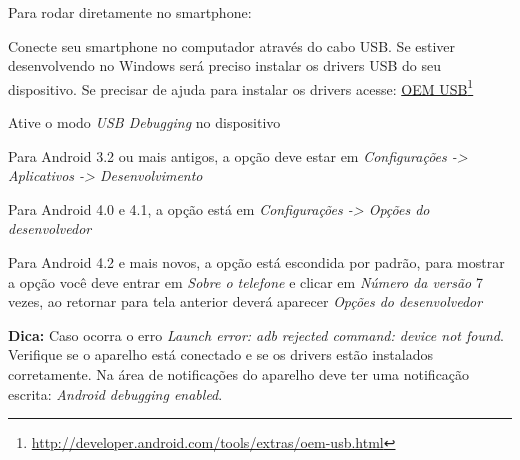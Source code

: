 \documentclass[a4paper,12pt,brazil,oneside]{book}
\begin{document}
\begin{singlespace}
Para rodar diretamente no smartphone:
\be
\item Conecte seu smartphone no computador através do cabo USB. Se estiver desenvolvendo no Windows será preciso instalar os drivers USB do seu dispositivo. Se precisar de ajuda para instalar os drivers acesse: \href{http://developer.android.com/tools/extras/oem-usb.html}{OEM USB}\footnote{\href{http://developer.android.com/tools/extras/oem-usb.html}{http://developer.android.com/tools/extras/oem-usb.html}}
\item Ative o modo \emph{USB Debugging} no dispositivo
	\bi
	\item Para Android 3.2 ou mais antigos, a opção deve estar em \textit{Configurações -> Aplicativos	 -> Desenvolvimento}
	\item Para Android 4.0 e 4.1, a opção está em \textit{Configurações -> Opções do desenvolvedor}
	\item Para Android 4.2 e mais novos, a opção está escondida por padrão, para mostrar a opção você deve entrar em \textit{Sobre o telefone} e clicar em \textit{Número da versão} 7 vezes, ao retornar para tela anterior deverá aparecer \textit{Opções do desenvolvedor}
	\ei
\ee

\begin{framed}
\textbf{Dica:} Caso ocorra o erro \emph{Launch error: adb rejected command: device not found}. Verifique se o aparelho está conectado e se os drivers estão instalados corretamente. Na área de notificações do aparelho deve ter uma notificação escrita: \emph{Android debugging enabled}. 
\end{framed}


\end{singlespace}
\end{document}
